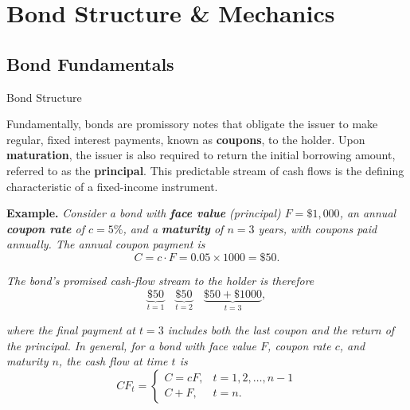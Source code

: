 \documentclass[10pt]{article}
\begin{document}
\section{Bond Structure \& Mechanics}

  \subsection{Bond Fundamentals}

    \begin{core}{Bond Structure}

      Fundamentally, bonds are promissory notes that obligate the issuer to make regular, fixed interest payments, known as \textbf{coupons}, to the holder. Upon \textbf{maturation}, the issuer is also required to return the initial borrowing amount, referred to as the \textbf{principal}. This predictable stream of cash flows is the defining characteristic of a fixed-income instrument. 

      \textbf{Example.} \textit{Consider a bond with \textbf{face value} (principal) $F = \$1{,}000$, an annual \textbf{coupon rate} of $c = 5\%$, and a \textbf{maturity} of $n = 3$ years, with coupons paid annually. The annual coupon payment is}
      \[
        C = c \cdot F = 0.05 \times 1000 = \$50.
      \]

      \textit{The bond's promised cash-flow stream to the holder is therefore}
      \[
        \underbrace{\$50}_{t=1} \quad \underbrace{\$50}_{t=2} \quad \underbrace{\$50 + \$1000}_{t=3},
      \]

      \textit{where the final payment at $t = 3$ includes both the last coupon and the return of the principal. In general, for a bond with face value $F$, coupon rate $c$, and maturity $n$, the cash flow at time $t$ is}
      \[
        CF_t =
        \begin{cases}
          C = cF, & t = 1, 2, \dots, n-1 \\
          C + F, & t = n.
        \end{cases}
      \]

    \end{core}
\end{document}
